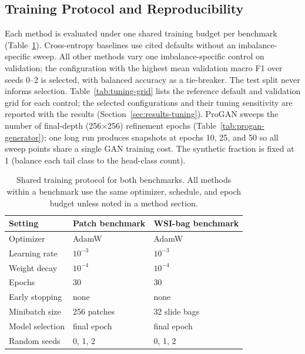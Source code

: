 \documentclass[11pt]{article}
\begin{document}
\subsection{Training Protocol and Reproducibility}
\label{sec:training-protocol}
Each method is evaluated under one shared training budget per benchmark (Table~\ref{tab:training-protocol}). Cross-entropy baselines use cited defaults without an imbalance-specific sweep. All other methods vary one imbalance-specific control on validation; the configuration with the highest mean validation macro F1 over seeds 0--2 is selected, with balanced accuracy as a tie-breaker. The test split never informs selection. Table~\ref{tab:tuning-grid} lists the reference default and validation grid for each control; the selected configurations and their tuning sensitivity are reported with the results (Section~\ref{sec:results-tuning}). ProGAN sweeps the number of final-depth (256$\times$256) refinement epochs (Table~\ref{tab:progan-generator}); one long run produces snapshots at epochs 10, 25, and 50 so all sweep points share a single GAN training cost. The synthetic fraction is fixed at 1 (balance each tail class to the head-class count).

\begin{table}[ht]
  \centering
  \small
  \begin{tabular}{lll}
    \toprule
    Setting & Patch benchmark & WSI-bag benchmark\\
    \midrule
    Optimizer & AdamW & AdamW\\
    Learning rate & $10^{-3}$ & $10^{-3}$\\
    Weight decay & $10^{-4}$ & $10^{-4}$\\
    Epochs & 30 & 30\\
    Early stopping & none & none\\
    Minibatch size & 256 patches & 32 slide bags\\
    Model selection & final epoch & final epoch\\
    Random seeds & 0, 1, 2 & 0, 1, 2\\
    \bottomrule
  \end{tabular}
  \caption{Shared training protocol for both benchmarks. All methods within a benchmark use the same optimizer, schedule, and epoch budget unless noted in a method section.}
  \label{tab:training-protocol}
\end{table}
\end{document}
